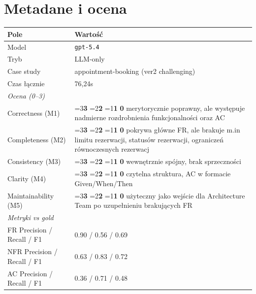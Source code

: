 \documentclass[12pt,a4paper]{article}
\newcommand{\scorebox}[1]{%
  \ifnum#1=3\colorbox{score3}{\textbf{3}}%
  \else\ifnum#1=2\colorbox{score2}{\textbf{2}}%
  \else\ifnum#1=1\colorbox{score1}{\textbf{1}}%
  \else\colorbox{score0}{\textbf{0}}\fi\fi\fi
}
\begin{document}
\section{Metadane i ocena}
\begin{table}[h]
\begin{tabularx}{\textwidth}{l X}
\toprule
\textbf{Pole} & \textbf{Wartość} \\
\midrule
Model & \texttt{gpt-5.4} \\
Tryb & LLM-only \\
Case study & appointment-booking (ver2 challenging) \\
Czas łącznie & 76,24s \\
\midrule
\multicolumn{2}{l}{\textit{Ocena (0--3)}} \\
\midrule
Correctness (M1)     & \scorebox{2} \quad merytorycznie poprawny, ale występuje nadmierne rozdrobnienia funkcjonalności oraz AC\\
Completeness (M2)    & \scorebox{2} \quad pokrywa główne FR,  ale brakuje m.in limitu rezerwacji, statusów rezerwacji, ograniczeń równoczesnych rezerwacj \\
Consistency (M3)     & \scorebox{3} \quad wewnętrznie spójny, brak sprzeczności \\
Clarity (M4)         & \scorebox{3} \quad czytelna struktura, AC w formacie Given/When/Then \\
Maintainability (M5) & \scorebox{2} \quad użyteczny jako wejście dla Architecture Team po uzupełnieniu brakujących FR \\
\midrule
\multicolumn{2}{l}{\textit{Metryki vs gold}} \\
\midrule
FR Precision / Recall / F1   & 0.90 / 0.56 / 0.69 \\
NFR Precision / Recall / F1  & 0.63 / 0.83 / 0.72 \\
AC Precision / Recall / F1   & 0.36 / 0.71 / 0.48 \\
\bottomrule
\end{tabularx}
\end{table}
\end{document}

